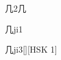 \begin{entry}{几}{2}{⼏}
  \begin{phonetics}{几}{ji1}
  \end{phonetics}
  \begin{phonetics}{几}{ji3}[][HSK 1]
  \end{phonetics}
\end{entry}
